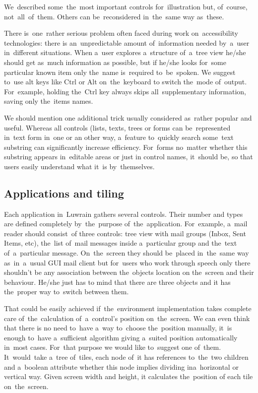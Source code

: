 \documentclass{acm_proc_article-sp}
\begin{document}
We~described some~the~most important controls for~illustration but, of~course, not~all~of~them.
Others can be~reconsidered in~the~same way as~these. 

There is~one~rather serious problem often faced during work on~accessibility technologies:
there is an~unpredictable amount of~information 
needed by~a~user in~different situations.
When a~user explores a~structure of~a~tree view he/she should get as~much information as possible, 
but if he/she looks for~some particular known item only  the~name is~required to~be~spoken.
We suggest to~use alt keys like Ctrl or Alt on~the~keyboard to switch the~mode of~output.
For~example, holding the~Ctrl key always skips all~supplementary information, saving only the~items names. 

We should mention one additional trick usually considered as~rather popular and useful.
Whereas all controls (lists, texts, trees or forms  can be~represented in~text form in~one or an other way, 
a~feature to~quickly search some~text substring can significantly increase efficiency.
For~forms no~matter  whether this substring appears  in~editable areas or just in control names,
it~should be,
so that users easily understand what it~is by~themselves.

\subsection{Applications and tiling}

Each application in~Luwrain gathers several controls.
Their number and types are defined completely by~the~purpose of~the~application.
For~example, a~mail reader should  consist~of three controls:
tree view with mail groups (Inbox, Sent Items, etc),
the~list of~mail messages inside a~particular group and the~text of~a~particular message.
On~the~screen they should be~placed in~the~same way as~in~a~usual GUI mail client 
but for~users who work through speech  only there shouldn't be any association 
between the~objects location on the~screen and their behaviour.
He/she just has to mind that there are three objects and it has the~proper way to~switch between them.

That could be easily achieved if~the~environment implementation 
takes complete care of~the~calculation of~a~control's position on~the~screen.
We can even think  that there is no need to~have a~way to~choose the~position manually,
it~is enough to~have a~sufficient algorithm giving a~suited position automatically in~most cases.
For~that purpose we would like to~suggest one of~them.
It~would~take a~tree of~tiles, 
each node of~it has references to~the~two children and a~boolean attribute 
whether this node implies dividing  ina~horizontal or vertical way.
Given screen width and height, it calculates the~position of each tile on~the~screen.
\end{document}

